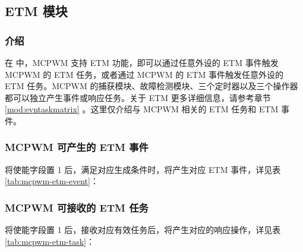 \documentclass[main\_\_CN.tex]{subfiles}
\begin{document}
\subsection{ETM 模块}

\subsubsection{介绍}
在 \chipname{} 中，MCPWM 支持 ETM 功能，即可以通过任意外设的 ETM 事件触发 MCPWM 的 ETM 任务，或者通过 MCPWM 的 ETM 事件触发任意外设的 ETM 任务。MCPWM 的捕获模块、故障检测模块、三个定时器以及三个操作器都可以独立产生事件或响应任务。关于 ETM 更多详细信息，请参考章节 \ref{mod:evntaskmatrix} 。这里仅介绍与 MCPWM 相关的 ETM 任务和 ETM 事件。

\subsubsection{MCPWM 可产生的 ETM 事件}

将使能字段置 1 后，满足对应生成条件时，将产生对应 ETM 事件，详见表 \ref{tab:mcpwm-etm-event}：



\subsubsection{MCPWM 可接收的 ETM 任务}

将使能字段置 1 后，接收对应有效任务后，将产生对应的响应操作，详见表 \ref{tab:mcpwm-etm-task}：


\end{document}
